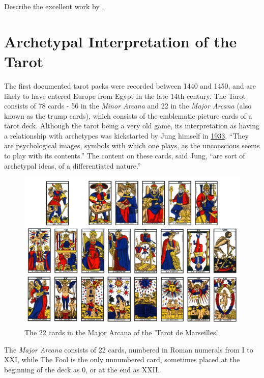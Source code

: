\documentclass[]{book}
\begin{document}
Describe the excellent work by \citet{lequellec2013jung}.

\hypertarget{archetypal-interpretation-of-the-tarot}{%
\section{Archetypal Interpretation of the Tarot}\label{archetypal-interpretation-of-the-tarot}}

The first documented tarot packs were recorded between 1440 and 1450, and are likely to have entered Europe from Egypt in the late 14th century. The Tarot consists of 78 cards - 56 in the \emph{Minor Arcana} and 22 in the \emph{Major Arcana} (also known as the trump cards), which consists of the emblematic picture cards of a tarot deck. Although the tarot being a very old game, its interpretation as having a relationship with archetypes was kickstarted by Jung himself in \href{https://marykgreer.com/2008/03/31/carl-jung-and-tarot/}{1933}. ``They are psychological images, symbols with which one plays, as the unconscious seems to play with its contents.'' The content on these cards, said Jung, ``are sort of archetypal ideas, of a differentiated nature.''

\begin{figure}

{\centering \includegraphics[width=\textwidth]{img/tarot} 

}

\caption{The 22 cards in the Major Arcana of the 'Tarot de Marseilles'.}\label{fig:unnamed-chunk-2}
\end{figure}

The \emph{Major Arcana} consists of 22 cards, numbered in Roman numerals from I to XXI, while The Fool is the only unnumbered card, sometimes placed at the beginning of the deck as 0, or at the end as XXII.
\end{document}
